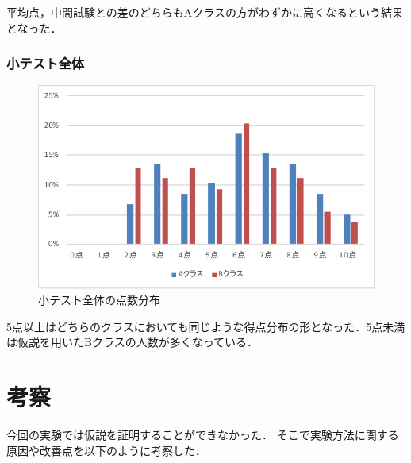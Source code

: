 \documentclass[a4j,12pt]{jsarticle}
\begin{document}
平均点，中間試験との差のどちらもAクラスの方がわずかに高くなるという結果となった．




\newpage
\subsubsection{小テスト全体}

\begin{figure}[H]
\centering
\includegraphics[width=12cm]{123test.pdf}
\caption{小テスト全体の点数分布}
\label{fig:no}
\end{figure}

\vspace{1zh}
\begin{table}[H]
\centering
\caption{小テストの偏差値と平均点}
\label{fig:12ank}
\end{table}

5点以上はどちらのクラスにおいても同じような得点分布の形となった．5点未満は仮説を用いたBクラスの人数が多くなっている．
 


\newpage
\section{考察}
今回の実験では仮説を証明することができなかった．
そこで実験方法に関する原因や改善点を以下のように考察した．
\end{document}
